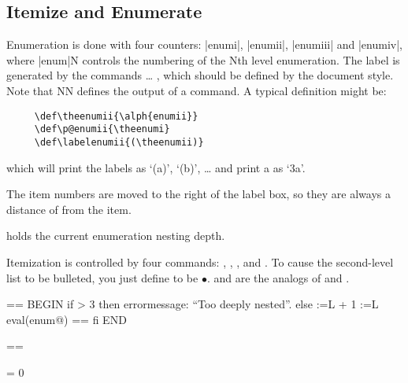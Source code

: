  \begin{macro}{\usecounter}
    \begin{teX}
\def\usecounter#1{\@nmbrlisttrue\def\@listctr{#1}\setcounter{#1}\z@}
    \end{teX}
 \end{macro}


 \subsection{Itemize and Enumerate}

  Enumeration is done with four counters: |enumi|, |enumii|, |enumiii|
  and |enumiv|, where |enum|N controls the numbering of the Nth level
  enumeration.  The label is generated by the commands
   \ldots{} , which should be defined
  by the document style.
  Note that NN defines the output
  of a  command.  A typical definition might be:
 \begin{verbatim}
     \def\theenumii{\alph{enumii}}
     \def\p@enumii{\theenumi}
     \def\labelenumii{(\theenumii)}
 \end{verbatim}
 which will print the labels as `(a)', `(b)', \ldots
 and print a  as `3a'.

 The item numbers are moved to the right of the label box, so they are
 always a distance of  from the item.

  holds the current enumeration nesting depth.

 Itemization is controlled by four commands: ,
 ,
 , and .
 To cause the second-level list to be
 bulleted, you just define 
 to be $\bullet$.  
 and  are the analogs of  and
 .

 \begin{teX}
 \enumerate ==
   BEGIN
     if \@enumdepth > 3
       then errormessage: ``Too deeply nested''.
       else \@enumdepth :=L \@enumdepth + 1
            \@enumctr :=L eval(enum@\romannumeral\the\@enumdepth)
            \list{\label(\@enumctr)}
                 {\usecounter{\@enumctr}
                   ==  \hss {}}
     fi
   END

 \endenumerate == \endlist
 \end{teX}

 \begin{macro}{\@enumdepth}
    \begin{teX}
\newcount\@enumdepth \@enumdepth = 0
    \end{teX}
 \end{macro}

